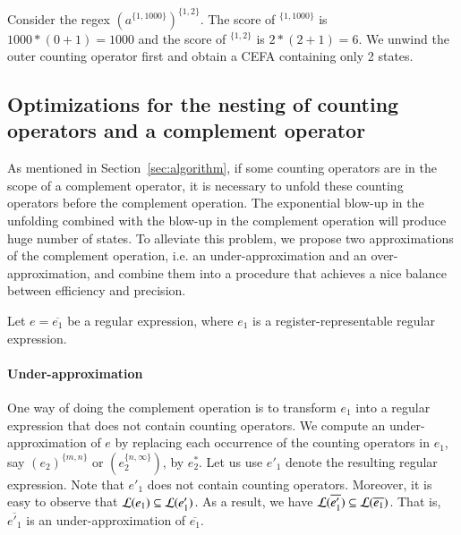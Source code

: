 {\begin{example}
  Consider the regex $(a^{\{1,1000\}})^{\{1,2\}}$. The score of $^{\{1,1000\}}$ is $1000*(0+1) = 1000$ and the score of $^{\{1,2\}}$ is $2*(2+1) = 6$. We unwind the outer counting operator first and obtain a CEFA containing only 2 states.  
\end{example}
}



\subsection{Optimizations for the nesting of counting operators and a complement operator}

As mentioned in Section~\ref{sec:algorithm}, if some counting operators are in the scope of a complement operator, it is necessary to unfold these counting operators before the complement operation. The exponential blow-up in the unfolding combined with the blow-up in the complement operation will produce huge number of states.  To alleviate this problem, we propose two approximations of the complement operation, i.e. an under-approximation and an over-approximation, and combine them into a procedure that achieves a nice balance between efficiency and precision. 

Let $e = \overline{e_1}$ be a regular expression, where $e_1$ is a register-representable regular expression. 

\paragraph*{Under-approximation}
%
One way of doing the complement operation is to transform $e_1$ into a regular expression that does not contain counting operators. We compute an under-approximation of $e$ by replacing each occurrence of the counting operators in $e_1$, say $(e_2)^{\{m,n\}}$ or $(e_2^{\{n, \infty\}})$, by $e_2^*$. Let us use $e'_1$ denote the resulting regular expression. Note that $e'_1$ does not contain counting operators. Moreover, it is easy to observe that $\mathcal{L}(e_1) \subseteq \mathcal{L}(e'_1)$. As a result, we have $\mathcal{L}(\overline{e'_1}) \subseteq \mathcal{L}(\overline{e_1})$. That is, $\overline{e'_1}$ is an under-approximation of $\overline{e_1}$. 


